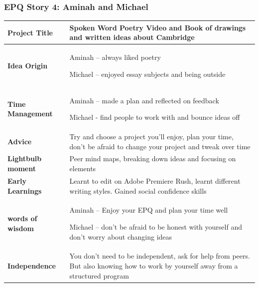 \subsubsection*{EPQ Story 4: Aminah and Michael}
\begin{tabularx}{\textwidth}{@{}lX@{}}
    \toprule
    \textbf{Project Title}    & Spoken Word Poetry Video and Book of drawings and written ideas about Cambridge                         \\
    \midrule
    \textbf{Idea Origin}      &
    Aminah – always liked poetry

    Michael – enjoyed essay subjects and being outside                                                                                  \\
    \textbf{Time Management}  &
    Aminah – made a plan and reflected on feedback

    Michael - find people to work with and bounce ideas off                                                                             \\
    \textbf{Advice}           &
    Try and choose a project you'll enjoy, plan your time, don't be afraid to change your project and tweak over time
    \\
    \textbf{Lightbulb moment} &
    Peer mind maps, breaking down ideas and focusing on elements
    \\

    \textbf{Early Learnings}  & Learnt to edit on Adobe Premiere Rush, learnt different writing styles. Gained social confidence skills \\

    \textbf{words of wisdom}  &
    Aminah – Enjoy your EPQ and plan your time well

    Michael – don't be afraid to be honest with yourself and don't worry about changing ideas                                           \\

    \textbf{Independence}    &
    You don't need to be independent, ask for help from peers. But also knowing how to work by yourself away from a structured program  \\

    \bottomrule
\end{tabularx}

